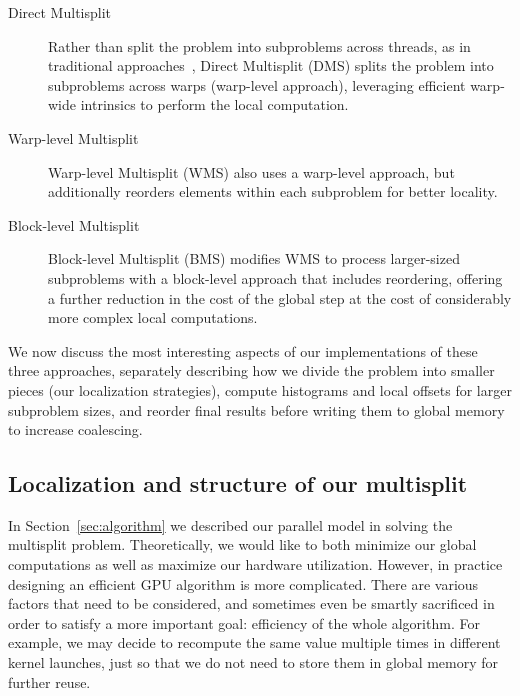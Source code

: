 \begin{description}
\item[Direct Multisplit] Rather than split the problem into subproblems across threads, as in traditional approaches~\cite{He:2008:RJG}, Direct Multisplit (DMS) splits the problem into subproblems across warps (warp-level approach), leveraging efficient warp-wide intrinsics to perform the local computation.
\item[Warp-level Multisplit] Warp-level Multisplit (WMS) also uses a warp-level approach, but additionally reorders elements within each subproblem for better locality.
\item[Block-level Multisplit] Block-level Multisplit (BMS) modifies WMS to process larger-sized subproblems with a block-level approach that includes reordering, offering a further reduction in the cost of the global step at the cost of considerably more complex local computations.
\end{description}

We now discuss the most interesting aspects of our implementations of these three approaches, separately describing how we divide the problem into smaller pieces (our localization strategies), compute histograms and local offsets for larger subproblem sizes, and reorder final results before writing them to global memory to increase coalescing.
\subsection{Localization and structure of our multisplit}\label{subsec:ms_localization}
In Section~\ref{sec:algorithm} we described our parallel model in solving the multisplit problem.
Theoretically, we would like to both minimize our global computations as well as maximize our hardware utilization.
However, in practice designing an efficient GPU algorithm is more complicated.
There are various factors that need to be considered, and sometimes even be smartly sacrificed in order to satisfy a more important goal: efficiency of the whole algorithm.
For example, we may decide to recompute the same value multiple times in different kernel launches, just so that we do not need to store them in global memory for further reuse.

